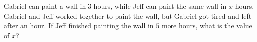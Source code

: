 Gabriel can paint a wall in $3$ hours, while Jeff can paint the same wall in $x$ hours. Gabriel and Jeff worked together to paint the wall, but Gabriel got tired and left after an hour. If Jeff finished painting the wall in $5$ more hours, what is the value of $x$?
